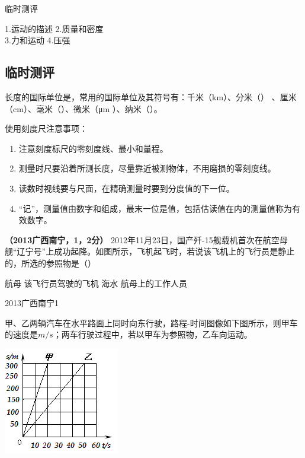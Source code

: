 \documentclass[12pt,twoside]{exam}
\newcommand{\keti}{临时测评}
\newcommand{\zhongdian}{1.运动的描述 2.质量和密度 \\3.力和运动 4.压强}
\begin{document}
\vspace*{70pt}
\keti \par
\zhongdian \par
\begin{knowledge}
\section{临时测评}
\begin{questions}
\question
长度的国际单位是\answerline*[米]，常用的国际单位及其符号有：千米（km）、分米（\answerline*[dm]） 、厘米（cm）、毫米（\answerline*[mm]）、微米（\si{\micro m}
）、纳米（\answerline*[nm]）。

\question
使用刻度尺注意事项：
\begin{enumerate}
\item[①] 注意刻度标尺的零刻度线、最小\answerline*[分度值]和量程。
\item[②] 测量时尺要沿着所测长度，尽量靠近被测物体，不用磨损的零刻度线。
\item[③] 读数时视线要与尺面\answerline*[垂直]，在精确测量时要到分度值的下一位。
\item[④] “记”，测量值由数字和\answerline*[单位]组成，最末一位是\answerline*[估读]值，包括估读值在内的测量值称为有效数字。
\end{enumerate}


\question
\textbf{（2013广西南宁，1，2分） } 2012年11月23日，国产歼-15舰载机首次在航空母舰“辽宁号”上成功起降。如图所示，飞机起飞时，若说该飞机上的飞行员是静止的，所选的参照物是（\answerline*[B]）

\begin{oneparchoices}
\choice 航母 
\choice 该飞行员驾驶的飞机
\choice 海水
\choice 航母上的工作人员
\end{oneparchoices}

\begin{linefig}[0.8]{2013广西南宁1}
\end{linefig}



\question
甲、乙两辆汽车在水平路面上同时向东行驶，路程-时间图像如下图所示，则甲车的速度是\answerline*[15]$m/s$；两车行驶过程中，若以甲车为参照物，乙车向\answerline*[西]运动。

\includegraphics[scale=1]{figures/图片11.png} 



\end{questions}
\end{knowledge}
\end{document}
